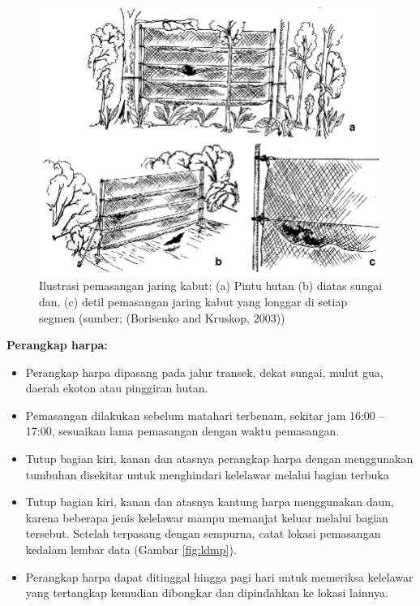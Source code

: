 \documentclass[
]{book}
\providecommand{\tightlist}{%
  \setlength{\itemsep}{0pt}\setlength{\parskip}{0pt}}
\begin{document}
\begin{figure}

{\centering \includegraphics[width=1\linewidth]{images/mistnetuses} 

}

\caption{Ilustrasi pemasangan jaring kabut; (a) Pintu hutan (b) diatas sungai dan, (c) detil pemasangan jaring kabut yang longgar di setiap segmen (sumber; (Borisenko and Kruskop, 2003))}\label{fig:mistnet}
\end{figure}

\textbf{Perangkap harpa:}

\begin{itemize}
\tightlist
\item
  Perangkap harpa dipasang pada jalur transek, dekat sungai, mulut gua, daerah ekoton atau pinggiran hutan.
\item
  Pemasangan dilakukan sebelum matahari terbenam, sekitar jam 16:00 -- 17:00, sesuaikan lama pemasangan dengan waktu pemasangan.
\item
  Tutup bagian kiri, kanan dan atasnya perangkap harpa dengan menggunakan tumbuhan disekitar untuk menghindari kelelawar melalui bagian terbuka
\item
  Tutup bagian kiri, kanan dan atasnya kantung harpa menggunakan daun, karena beberapa jenis kelelawar mampu memanjat keluar melalui bagian tersebut. Setelah terpasang dengan sempurna, catat lokasi pemasangan kedalam lembar data (Gambar \ref{fig:ldmp}).
\item
  Perangkap harpa dapat ditinggal hingga pagi hari untuk memeriksa kelelawar yang tertangkap kemudian dibongkar dan dipindahkan ke lokasi lainnya.
\end{itemize}
\end{document}

